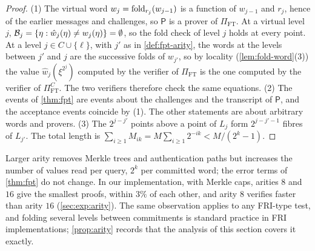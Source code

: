 \begin{proof}
(1) The virtual word $w_j = \mathrm{fold}_{r_j}(w_{j-1})$ is a function of $w_{j-1}$ and $r_j$, hence of the earlier messages and challenges, so $\mathsf{P}$ is a prover of $\Pi_{\mathrm{FT}}$. At a virtual level $j$, $\mathcal{B}_j = \{\eta : \hat w_j(\eta) \ne w_j(\eta)\} = \emptyset$, so the fold check of level $j$ holds at every point. At a level $j \in C \cup \{\ell\}$, with $j'$ as in \cref{def:fpt-arity}, the words at the levels between $j'$ and $j$ are the successive folds of $w_{j'}$, so by locality (\cref{lem:fold-word}(3)) the value $\hat w_j(\xi^{2^j})$ computed by the verifier of $\Pi_{\mathrm{FT}}$ is the one computed by the verifier of $\Pi^C_{\mathrm{FT}}$. The two verifiers therefore check the same equations.
(2) The events of \cref{thm:fpt} are events about the challenges and the transcript of $\mathsf{P}$, and the acceptance events coincide by (1). The other statements are about arbitrary words and provers.
(3) The $2^{j-j'}$ points above a point of $L_j$ form $2^{j-j'-1}$ fibres of $L_{j'}$. The total length is $\sum_{i \ge 1} M_{ik} = M \sum_{i \ge 1} 2^{-ik} < M/(2^k - 1)$.
\end{proof}

\begin{remark}\label{rem:arity}
Larger arity removes Merkle trees and authentication paths but increases the number of values read per query, $2^k$ per committed word; the error terms of \cref{thm:fpt} do not change. In our implementation, with Merkle caps, arities $8$ and $16$ give the smallest proofs, within $3\%$ of each other, and arity $8$ verifies faster than arity $16$ (\cref{sec:exp:arity}).
The same observation applies to any FRI-type test, and folding several levels between commitments is standard practice in FRI implementations; \cref{prop:arity} records that the analysis of this section covers it exactly.
\end{remark}

